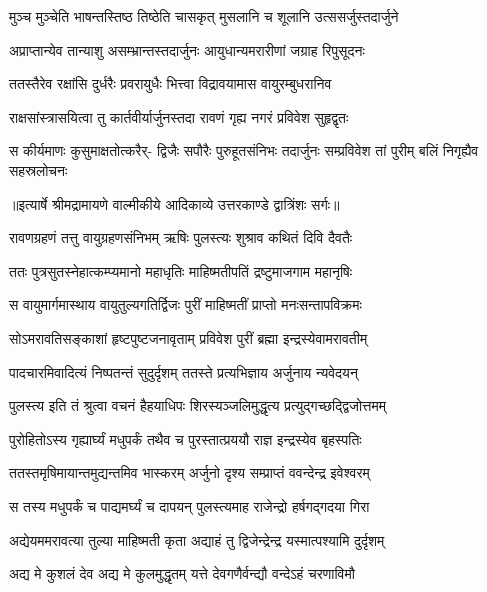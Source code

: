 \twolineshloka
{मुञ्च मुञ्चेति भाषन्तस्तिष्ठ तिष्ठेति चासकृत्}
{मुसलानि च शूलानि उत्ससर्जुस्तदार्जुने} %

\twolineshloka
{अप्राप्तान्येव तान्याशु असम्भ्रान्तस्तदार्जुनः}
{आयुधान्यमरारीणां जग्राह रिपुसूदनः} %

\twolineshloka
{ततस्तैरेव रक्षांसि दुर्धरैः प्रवरायुधैः}
{भित्त्वा विद्रावयामास वायुरम्बुधरानिव} %

\twolineshloka
{राक्षसांस्त्रासयित्वा तु कार्तवीर्यार्जुनस्तदा}
{रावणं गृह्य नगरं प्रविवेश सुहृद्वृतः} %

\fourlineindentedshloka
{स कीर्यमाणः कुसुमाक्षतोत्करैर्-}
{द्विजैः सपौरैः पुरुहूतसंनिभः}
{तदार्जुनः सम्प्रविवेश तां पुरीम्}
{बलिं निगृह्यैव सहस्रलोचनः} %


{॥इत्यार्षे श्रीमद्रामायणे वाल्मीकीये आदिकाव्ये उत्तरकाण्डे द्वात्रिंशः सर्गः॥}


\twolineshloka
{रावणग्रहणं तत्तु वायुग्रहणसंनिभम्}
{ऋषिः पुलस्त्यः शुश्राव कथितं दिवि दैवतैः} %

\twolineshloka
{ततः पुत्रसुतस्नेहात्कम्प्यमानो महाधृतिः}
{माहिष्मतीपतिं द्रष्टुमाजगाम महानृषिः} %

\twolineshloka
{स वायुमार्गमास्थाय वायुतुल्यगतिर्द्विजः}
{पुरीं माहिष्मतीं प्राप्तो मनःसन्तापविक्रमः} %

\twolineshloka
{सोऽमरावतिसङ्काशां हृष्टपुष्टजनावृताम्}
{प्रविवेश पुरीं ब्रह्मा इन्द्रस्येवामरावतीम्} %

\twolineshloka
{पादचारमिवादित्यं निष्पतन्तं सुदुर्दृशम्}
{ततस्ते प्रत्यभिज्ञाय अर्जुनाय न्यवेदयन्} %

\twolineshloka
{पुलस्त्य इति तं श्रुत्वा वचनं हैहयाधिपः}
{शिरस्यञ्जलिमुद्धृत्य प्रत्युद्गच्छद्द्विजोत्तमम्} %

\twolineshloka
{पुरोहितोऽस्य गृह्यार्घ्यं मधुपर्कं तथैव च}
{पुरस्तात्प्रययौ राज्ञ इन्द्रस्येव बृहस्पतिः} %

\twolineshloka
{ततस्तमृषिमायान्तमुद्यन्तमिव भास्करम्}
{अर्जुनो दृश्य सम्प्राप्तं ववन्देन्द्र इवेश्वरम्} %

\twolineshloka
{स तस्य मधुपर्कं च पाद्यमर्घ्यं च दापयन्}
{पुलस्त्यमाह राजेन्द्रो हर्षगद्गदया गिरा} %

\twolineshloka
{अद्येयममरावत्या तुल्या माहिष्मती कृता}
{अद्याहं तु द्विजेन्द्रेन्द्र यस्मात्पश्यामि दुर्दृशम्} %

\twolineshloka
{अद्य मे कुशलं देव अद्य मे कुलमुद्धृतम्}
{यत्ते देवगणैर्वन्द्यौ वन्देऽहं चरणाविमौ} %

